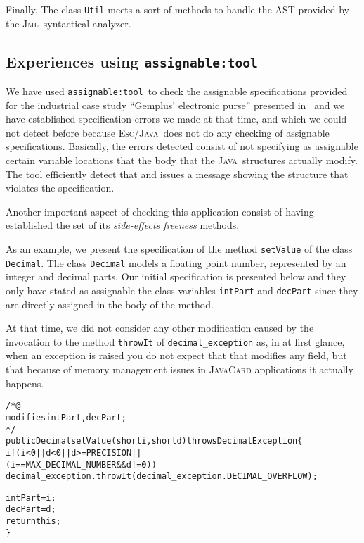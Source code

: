 \documentclass[a4paper]{llncs}
\newcommand{\jml}{\textsc{Jml}}
\newcommand{\escj}{\textsc{Esc/Java}}
\newcommand{\java}{\textsc{Java}}
\newcommand{\modtool}{\texttt{assignable:tool}}
\begin{document}
Finally, The class \texttt{Util} 
meets a sort of methods to handle the \textsc{AST} provided by the
\jml~syntactical analyzer.






\subsection{Experiences using \modtool}
\label{sub-sec-usi-the-too}
We have used \modtool~to check the assignable specifications provided
for the industrial case study ``Gemplus' electronic purse'' presented
in~\cite{CatanoH02a} and we have established specification
errors we made at that time, and which we could not detect before
because
\escj~does not do any checking of assignable
specifications. Basically, the errors detected consist of not
specifying as
assignable certain variable locations that the body that the
\java~structures actually modify. The tool efficiently detect
that and issues a message showing the structure that
violates the specification. 

Another important aspect of checking this application consist of
having established the set of its \emph{side-effects freeness}
methods. 

As an example, we present the specification of the
method \texttt{setValue} of the class \texttt{Decimal}. The class
\texttt{Decimal} models a floating point number, represented by an
integer and decimal parts. Our initial specification is presented
below and they only have stated as assignable the class variables
\texttt{intPart} and \texttt{decPart} since they are directly assigned 
in the body of the method. 

At that time, we did not consider any other
modification caused by the invocation to the method \texttt{throwIt}
of \texttt{decimal\_exception} as, in at first glance, when an exception
is raised you do not expect that that modifies any field, but that
because of memory management issues in \textsc{JavaCard} applications
it actually happens.
\begin{alltt}
/*@ 
  modifies intPart, decPart;
*/ 
public Decimal setValue(short i, short d) throws DecimalException\verb!{!
  if(i < 0 || d < 0 || d >= PRECISION || 
     (i == MAX_DECIMAL_NUMBER && d != 0))
    decimal_exception.throwIt(decimal_exception.DECIMAL_OVERFLOW);

  intPart = i;
  decPart = d;
  return this;
\verb!}!
\end{alltt}
\end{document}
